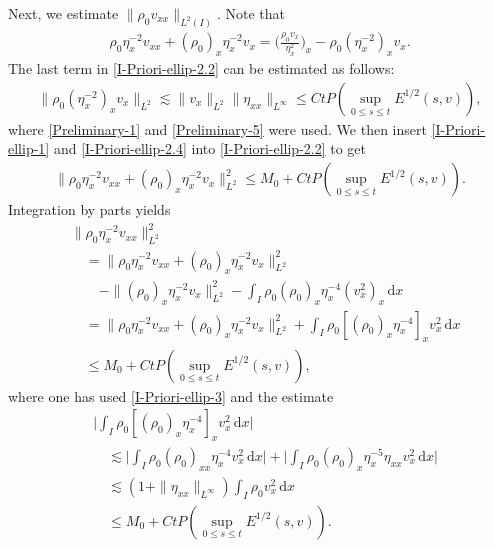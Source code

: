 \documentclass[11pt, reqno]{amsart}
\newcommand{\diff}{\mathrm{d}}
\numberwithin{equation}{section}
\begin{document}
Next, we estimate \(\|\rho_0v_{xx}\|_{L^2(I)}\). Note that
\begin{equation}\label{I-Priori-ellip-2.2}
\begin{aligned}
\rho_0\eta_x^{-2}v_{xx}+(\rho_0)_x\eta_x^{-2}v_{x}
=\bigg(\frac{\rho_0v_x}{\eta_x^2}\bigg)_{x}-
\rho_0(\eta_x^{-2})_{x}v_x.
\end{aligned}
\end{equation}
The last term in \eqref{I-Priori-ellip-2.2} can be estimated as follows:
\begin{equation}\label{I-Priori-ellip-2.4}
\begin{aligned}
\|\rho_0(\eta_x^{-2})_{x}v_x\|_{L^2}
\lesssim \|v_x\|_{L^2}\|\eta_{xx}\|_{L^\infty}
\leq Ct P(\sup_{0\leq s\leq t}E^{1/2}(s,v)),
\end{aligned}
\end{equation}
where \eqref{Preliminary-1} and \eqref{Preliminary-5} were used.
We then insert \eqref{I-Priori-ellip-1} and \eqref{I-Priori-ellip-2.4} into \eqref{I-Priori-ellip-2.2} to get
\begin{equation}\label{I-Priori-ellip-3}
\begin{aligned}
\|\rho_0\eta_x^{-2}v_{xx}+(\rho_0)_x\eta_x^{-2}v_{x}\|_{L^2}^2
\leq M_0+CtP(\sup_{0\leq s\leq t}E^{1/2}(s,v)).
\end{aligned}
\end{equation}
Integration by parts yields
\begin{equation}\label{I-Priori-ellip-4}
\begin{aligned}
&\|\rho_0\eta_x^{-2}v_{xx}\|_{L^2}^2\\
&\quad= \|\rho_0\eta_x^{-2}v_{xx}+(\rho_0)_x\eta_x^{-2}v_{x}\|_{L^2}^2\\
&\qquad-\|(\rho_0)_x\eta_x^{-2}v_{x}\|_{L^2}^2
-\int_I\rho_0(\rho_0)_x\eta_x^{-4}(v_x^2)_x\,\diff x\\
&\quad=\|\rho_0\eta_x^{-2}v_{xx}+(\rho_0)_x\eta_x^{-2}v_{x}\|_{L^2}^2+
\int_I\rho_0[(\rho_0)_x\eta_x^{-4}]_{x}v_x^2\,\diff x\\
&\quad\leq M_0+Ct P(\sup_{0\leq s\leq t}E^{1/2}(s,v)),
\end{aligned}
\end{equation}
where one has used \eqref{I-Priori-ellip-3} and the estimate
\begin{equation}\label{additial estimate}
\begin{aligned}
&\bigg|\int_I\rho_0[(\rho_0)_x\eta_x^{-4}]_xv_x^2\,\diff x\bigg|\\
&\quad\lesssim \bigg|\int_I\rho_0(\rho_0)_{xx}\eta_x^{-4}v_x^2\,\diff x\bigg|
+\bigg|\int_I\rho_0(\rho_0)_x\eta_x^{-5}\eta_{xx}v_x^2\,\diff x\bigg|\\
&\quad\lesssim
(1+\|\eta_{xx}\|_{L^\infty})\int_I\rho_0v_x^2\,\diff x\\
&\quad\leq M_0+Ct P(\sup_{0\leq s\leq t}E^{1/2}(s,v)).
\end{aligned}
\end{equation}
\end{document}
